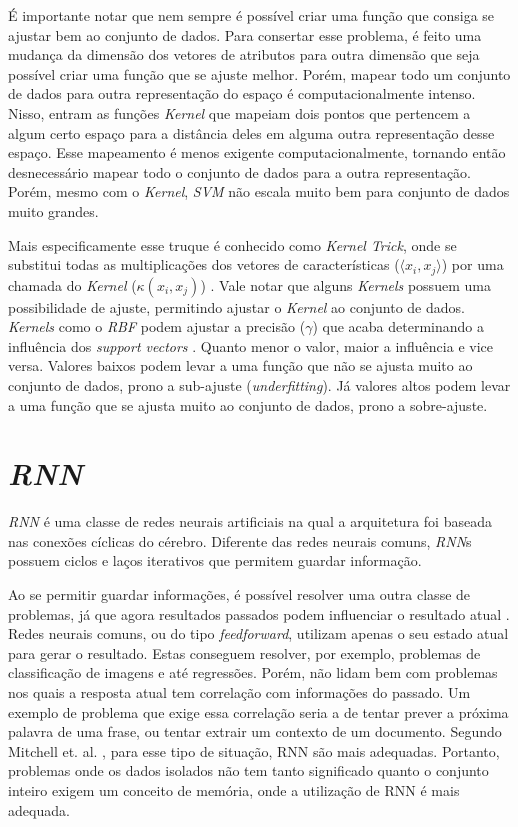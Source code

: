 É importante notar que nem sempre é possível criar uma função que consiga se ajustar bem ao conjunto de dados. Para consertar esse problema, é feito uma mudança da dimensão dos vetores de atributos para outra dimensão que seja possível criar uma função que se ajuste melhor. Porém, mapear todo um conjunto de dados para outra representação do espaço é computacionalmente intenso. Nisso, entram as funções \textit{Kernel} que mapeiam dois pontos que pertencem a algum certo espaço para a distância deles em alguma outra representação desse espaço. Esse mapeamento é menos exigente computacionalmente, tornando então desnecessário mapear todo o conjunto de dados para a outra representação. Porém, mesmo com o \textit{Kernel}, \textit{\acrshort{SVM}} não escala muito bem para conjunto de dados muito grandes. \cite{chollet2018deep}

Mais especificamente esse truque é conhecido como \textit{Kernel Trick}, onde se substitui todas as multiplicações dos vetores de características (\(\langle x_i, x_j \rangle\)) por uma chamada do \textit{Kernel} (\(\kappa(x_i, x_j)\)) \cite{murphy2012machine}. Vale notar que alguns \textit{Kernels} possuem uma possibilidade de ajuste, permitindo ajustar o \textit{Kernel} ao conjunto de dados. \textit{Kernels} como o \textit{\acrfull{RBF}} podem ajustar a precisão (\(\gamma\)) que acaba determinando a influência dos \textit{support vectors} \cite{murphy2012machine}. Quanto menor o valor, maior a influência e vice versa. Valores baixos podem levar a uma função que não se ajusta muito ao conjunto de dados, prono a sub-ajuste (\textit{underfitting}). Já valores altos podem levar a uma função que se ajusta muito ao conjunto de dados, prono a sobre-ajuste.

\section{\textit{\acrfull{RNN}}}

\textit{\acrshort{RNN}} é uma classe de redes neurais artificiais na qual a arquitetura foi baseada nas conexões cíclicas do cérebro. Diferente das redes neurais comuns, \textit{\acrshort{RNN}}s possuem ciclos e laços iterativos que permitem guardar informação. \cite{alex2012} 

Ao se permitir guardar informações, é possível resolver uma outra classe de problemas, já que agora resultados passados podem influenciar o resultado atual \cite{alex2012}. Redes neurais comuns, ou do tipo \textit{feedforward}, utilizam apenas o seu estado atual para gerar o resultado. Estas conseguem resolver, por exemplo, problemas de classificação de imagens e até regressões. Porém, não lidam bem com problemas nos quais a resposta atual tem correlação com informações do passado. Um exemplo de problema que exige essa correlação seria a de tentar prever a próxima palavra de uma frase, ou tentar extrair um contexto de um documento. Segundo Mitchell et. al. \cite{Mitchell_1997}, para esse tipo de situação, {\acrshort{RNN}} são mais adequadas. Portanto, problemas onde os dados isolados não tem tanto significado quanto o conjunto inteiro exigem um conceito de memória, onde a utilização de \acrshort{RNN} é mais adequada.

